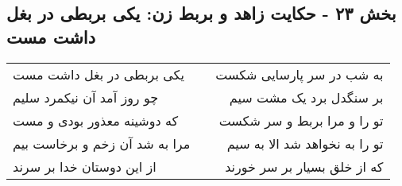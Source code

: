 \begin{center}
\section*{بخش ۲۳ - حکایت زاهد و بربط زن: یکی بربطی در بغل داشت مست}
\label{sec:023}
\begin{longtable}{l p{0.5cm} r}
یکی بربطی در بغل داشت مست
&&
به شب در سر پارسایی شکست
\\
چو روز آمد آن نیکمرد سلیم
&&
بر سنگدل برد یک مشت سیم
\\
که دوشینه معذور بودی و مست
&&
تو را و مرا بربط و سر شکست
\\
مرا به شد آن زخم و برخاست بیم
&&
تو را به نخواهد شد الا به سیم
\\
از این دوستان خدا بر سرند
&&
که از خلق بسیار بر سر خورند
\\
\end{longtable}
\end{center}
